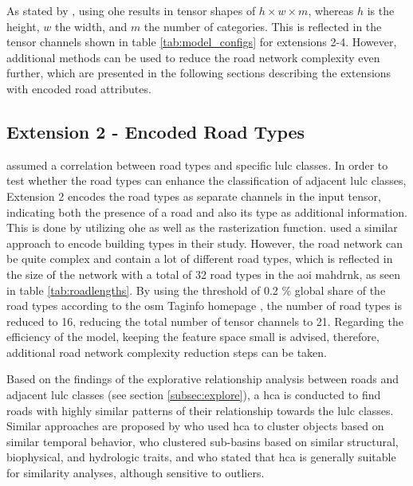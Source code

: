 As stated by \textcite{Courtial.Touya.ea2022}, using \gls{ohe} results in tensor shapes of \( h \times w \times m \), whereas \( h \) is the height, \( w \) the width, and \( m \) the number of categories. This is reflected in the tensor channels shown in table \ref{tab:model_configs} for extensions 2-4. However, additional methods can be used to reduce the road network complexity even further, which are presented in the following sections describing the extensions with encoded road attributes.

\subsection{Extension 2 - Encoded Road Types}
\label{sec:ext2}

\textcite{Ahmadzai2020,Forget.Linard.ea2018} assumed a correlation between road types and specific \gls{lulc} classes. In order to test whether the road types can enhance the classification of adjacent \gls{lulc} classes, Extension 2 encodes the road types as separate channels in the input tensor, indicating both the presence of a road and also its type as additional information. This is done by utilizing \gls{ohe} as well as the rasterization function. \textcite{Courtial.Touya.ea2022} used a similar approach to encode building types in their study. However, the road network can be quite complex and contain a lot of different road types, which is reflected in the size of the network with a total of 32 road types in the \gls{aoi} \gls{mahdrnk}, as seen in table \ref{tab:roadlengths}. By using the threshold of 0.2 \% global share of the road types according to the \gls{osm} Taginfo homepage \autocite{OSMTaginfo2024}, the number of road types is reduced to 16, reducing the total number of tensor channels to 21. Regarding the efficiency of the model, keeping the feature space small is advised, therefore, additional road network complexity reduction steps can be taken.

Based on the findings of the explorative relationship analysis between roads and adjacent \gls{lulc} classes (see section \ref{subsec:explore}), a \gls{hca} is conducted to find roads with highly similar patterns of their relationship towards the \gls{lulc} classes. Similar approaches are proposed by \textcite{Yao.Chen.ea2023} who used \gls{hca} to cluster objects based on similar temporal behavior, \textcite{Petrakis.Norman.ea2021} who clustered sub-basins based on similar structural, biophysical, and hydrologic traits, and \textcite{Montazeri.Lilienthal.ea2021} who stated that \gls{hca} is generally suitable for similarity analyses, although sensitive to outliers.

